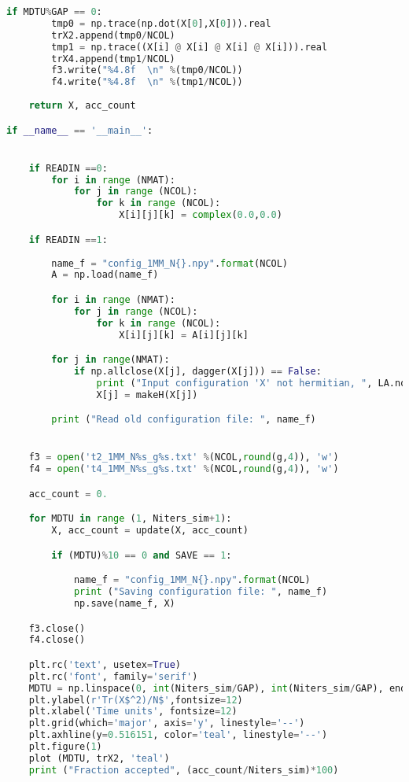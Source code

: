 \begin{footnotesize}
\begin{lstlisting}[language=Python]
    if MDTU%GAP == 0:
        tmp0 = np.trace(np.dot(X[0],X[0])).real
        trX2.append(tmp0/NCOL)
        tmp1 = np.trace((X[i] @ X[i] @ X[i] @ X[i])).real
        trX4.append(tmp1/NCOL)
        f3.write("%4.8f  \n" %(tmp0/NCOL))
        f4.write("%4.8f  \n" %(tmp1/NCOL))
    
    return X, acc_count

if __name__ == '__main__':


    if READIN ==0:
        for i in range (NMAT): 
            for j in range (NCOL):
                for k in range (NCOL):
                    X[i][j][k] = complex(0.0,0.0) 

    if READIN ==1:
        
        name_f = "config_1MM_N{}.npy".format(NCOL)
        A = np.load(name_f)

        for i in range (NMAT):
            for j in range (NCOL):
                for k in range (NCOL):
                    X[i][j][k] = A[i][j][k]

        for j in range(NMAT):
            if np.allclose(X[j], dagger(X[j])) == False:
                print ("Input configuration 'X' not hermitian, ", LA.norm(X[j] - dagger(X[j])), "making it so")
                X[j] = makeH(X[j])

        print ("Read old configuration file: ", name_f)


    f3 = open('t2_1MM_N%s_g%s.txt' %(NCOL,round(g,4)), 'w')
    f4 = open('t4_1MM_N%s_g%s.txt' %(NCOL,round(g,4)), 'w')

    acc_count = 0.

    for MDTU in range (1, Niters_sim+1):
        X, acc_count = update(X, acc_count)

        if (MDTU)%10 == 0 and SAVE == 1:

            name_f = "config_1MM_N{}.npy".format(NCOL)
            print ("Saving configuration file: ", name_f)
            np.save(name_f, X)

    f3.close()
    f4.close()

    plt.rc('text', usetex=True)
    plt.rc('font', family='serif')
    MDTU = np.linspace(0, int(Niters_sim/GAP), int(Niters_sim/GAP), endpoint=True)
    plt.ylabel(r'Tr(X$^2)/N$',fontsize=12)
    plt.xlabel('Time units', fontsize=12)
    plt.grid(which='major', axis='y', linestyle='--')
    plt.axhline(y=0.516151, color='teal', linestyle='--')
    plt.figure(1)
    plot (MDTU, trX2, 'teal') 
    print ("Fraction accepted", (acc_count/Niters_sim)*100) 


\end{lstlisting}
\end{footnotesize}
